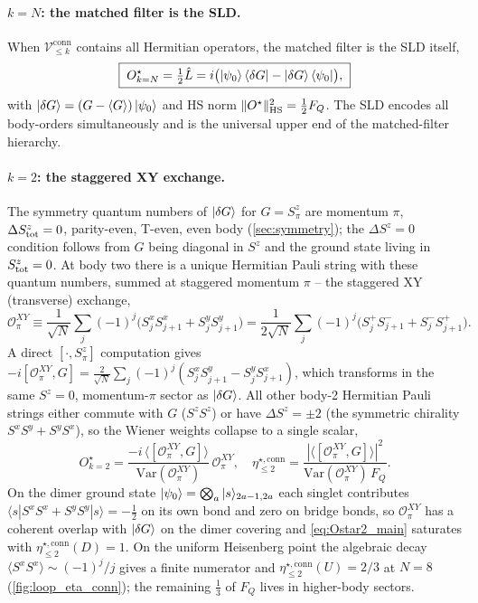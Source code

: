 \documentclass[11pt,a4paper]{article}
\newcommand{\FQ}{F_Q}
\newcommand{\Var}{\mathrm{Var}}
\newcommand{\SLD}{\hat{L}}
\newcommand{\PsiZ}{\ket{\psi_0}}
\newcommand{\BraZ}{\bra{\psi_0}}
\newcommand{\dG}{\ket{\delta G}}
\newcommand{\dGb}{\bra{\delta G}}
\newcommand{\Vconn}[1]{\mathcal{V}^{\mathrm{conn}}_{\le #1}}
\newcommand{\etaconn}[1]{\eta^{\star,\mathrm{conn}}_{\le #1}}
\begin{document}
\paragraph{$k=N$: the matched filter is the SLD.}
When $\Vconn{k}$ contains all Hermitian operators, the matched
filter is the SLD itself,
\begin{equation}
   \boxed{\;O^\star_{k=N}=\tfrac12\SLD
   =i\bigl(\PsiZ\dGb-\dG\BraZ\bigr),\;}
   \label{eq:OstarN_main}
\end{equation}
with $\dG=(G-\langle G\rangle)\PsiZ$ and HS norm
$\Vert O^\star\Vert_{\rm HS}^2=\tfrac12\FQ$.  The SLD encodes
all body-orders simultaneously and is the universal upper end
of the matched-filter hierarchy.

\paragraph{$k=2$: the staggered XY exchange.}
The symmetry quantum numbers of $\dG$ for $G=S^z_\pi$ are
momentum $\pi$, $\Delta S^z_{\rm tot}=0$, parity-even, T-even,
even body (\cref{sec:symmetry}); the $\Delta S^z=0$ condition
follows from $G$ being diagonal in $S^z$ and the ground state
living in $S^z_{\rm tot}=0$.  At body two there is a unique
Hermitian Pauli string with these quantum numbers, summed at
staggered momentum $\pi$ -- the staggered XY (transverse)
exchange,
\begin{equation}
   \mathcal O^{XY}_\pi
   \equiv\frac{1}{\sqrt N}\sum_{j}(-1)^j
   \bigl(S^x_jS^x_{j+1}+S^y_jS^y_{j+1}\bigr)
   =\frac{1}{2\sqrt N}\sum_j(-1)^j
   \bigl(S^+_jS^-_{j+1}+S^-_jS^+_{j+1}\bigr).
   \label{eq:Tplus_main}
\end{equation}
A direct $[\cdot,S^z_\pi]$ computation gives
$-i[\mathcal O^{XY}_\pi,G]=\frac{2}{\sqrt N}\sum_j(-1)^j(S^x_jS^y_{j+1}
-S^y_jS^x_{j+1})$, which transforms in the same $S^z=0$,
momentum-$\pi$ sector as $\dG$.  All other body-2 Hermitian
Pauli strings either commute with $G$ ($S^zS^z$) or have
$\Delta S^z=\pm 2$ (the symmetric chirality $S^xS^y+S^yS^x$),
so the Wiener weights collapse to a single scalar,
\begin{equation}
   \boxed{\;O^\star_{k=2}
   =\frac{-i\,\langle[\mathcal O^{XY}_\pi,G]\rangle}
         {\Var(\mathcal O^{XY}_\pi)}\,\mathcal O^{XY}_\pi,\quad
   \etaconn{2}
   =\frac{|\langle[\mathcal O^{XY}_\pi,G]\rangle|^2}
         {\Var(\mathcal O^{XY}_\pi)\,\FQ}.\;}
   \label{eq:Ostar2_main}
\end{equation}
On the dimer ground state
$\PsiZ=\bigotimes_a|s\rangle_{2a-1,2a}$ each singlet contributes
$\langle s|S^xS^x+S^yS^y|s\rangle=-\tfrac12$ on its own bond and
zero on bridge bonds, so $\mathcal O^{XY}_\pi$ has a coherent
overlap with $\dG$ on the dimer covering and
\eqref{eq:Ostar2_main} saturates with $\etaconn{2}(D)=1$.  On the
uniform Heisenberg point the algebraic decay
$\langle S^xS^x\rangle\sim(-1)^j/j$ gives a finite numerator and
$\etaconn{2}(U)=2/3$ at $N=8$ (\cref{fig:loop_eta_conn}); the
remaining $\tfrac13$ of $\FQ$ lives in higher-body sectors.
\end{document}
